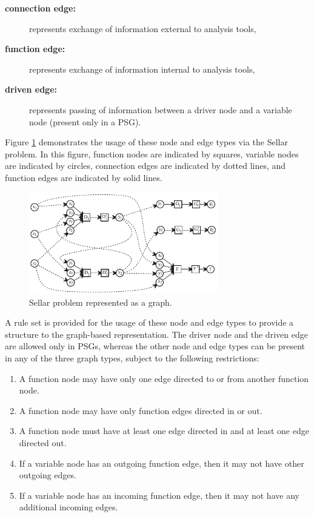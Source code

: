   \begin{description}
  \item[\bf{connection edge:}] represents exchange of information external to analysis tools,
  \item[\bf{function edge:}] represents exchange of information internal to analysis tools,
  \item[\bf{driven edge:}] represents passing of information between a driver node and a 
  variable node (present only in a PSG).
  \end{description}
  Figure \ref{f:sellar types} demonstrates the usage of these node and edge 
  types via the Sellar problem. 
In this figure, function nodes are indicated by squares, 
  variable nodes are indicated by circles, connection edges are indicated by 
  dotted lines, and function edges are indicated by solid lines.
  \begin{figure}[htb!]
    \begin{center}
      \includegraphics[width=3.25in]{images/sellar_types}
    \end{center}
    \caption{Sellar problem represented as a graph.}
  \label{f:sellar types}
  \end{figure} 

  A rule set is provided for the usage of these node and edge types to provide a structure 
  to the graph-based representation. The driver node and the driven edge are allowed only in 
  PSGs, whereas the other node and edge types can be present in any of the three graph types, 
  subject to the following restrictions: 
  \begin{enumerate}
  \item A function node may have only one edge directed to or from another function node.
  \item A function node may have only function edges directed in or out.
  \item A function node must have at least one edge directed in and at least one edge 
    directed out.
  \item If a variable node has an outgoing function edge, then it may not have other 
  outgoing edges.
  \item If a variable node has an incoming function edge, then it may not have any 
  additional incoming edges.
  \end{enumerate}

